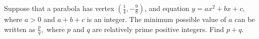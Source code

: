 Suppose that a parabola has vertex $\left(\tfrac{1}{4},-\tfrac{9}{8}\right)$, and equation $y=ax^2+bx+c$, where $a>0$ and $a+b+c$ is an integer. The minimum possible value of $a$ can be written as $\tfrac{p}{q},$ where $p$ and $q$ are relatively prime positive integers. Find $p+q$.